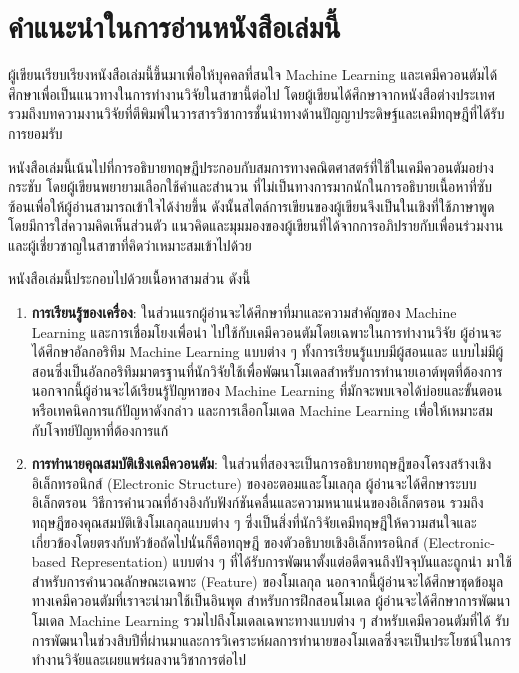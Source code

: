 

{

\chapter*{\centering คำแนะนำในการอ่านหนังสือเล่มนี้}

ผู้เขียนเรียบเรียงหนังสือเล่มนี้ขึ้นมาเพื่อให้บุคคลที่สนใจ Machine Learning และเคมีควอนตัมได้ศึกษาเพื่อเป็นแนวทางในการทำงานวิจัยในสาขานี้ต่อไป 
โดยผู้เขียนได้ศึกษาจากหนังสือต่างประเทศรวมถึงบทความงานวิจัยที่ตีพิมพ์ในวารสารวิชาการชั้นนำทางด้านปัญญาประดิษฐ์และเคมีทฤษฎีที่ได้รับการยอมรับ

หนังสือเล่มนี้เน้นไปที่การอธิบายทฤษฏีประกอบกับสมการทางคณิตศาสตร์ที่ใช้ในเคมีควอนตัมอย่างกระชับ โดยผู้เขียนพยายามเลือกใช้คำและสำนวน%
ที่ไม่เป็นทางการมากนักในการอธิบายเนื้อหาที่ซับซ้อนเพื่อให้ผู้อ่านสามารถเข้าใจได้ง่ายขึ้น ดังนั้นสไตล์การเขียนของผู้เขียนจึงเป็นในเชิงที่ใช้ภาษาพูด 
โดยมีการใส่ความคิดเห็นส่วนตัว แนวคิดและมุมมองของผู้เขียนที่ได้จากการอภิปรายกับเพื่อนร่วมงานและผู้เชี่ยวชาญในสาขาที่คิดว่าเหมาะสมเข้าไปด้วย

หนังสือเล่มนี้ประกอบไปด้วยเนื้อหาสามส่วน ดังนี้ 
%
\begin{enumerate}[topsep=0pt]
    \item \textbf{การเรียนรู้ของเครื่อง}: ในส่วนแรกผู้อ่านจะได้ศึกษาที่มาและความสำคัญของ Machine Learning และการเชื่อมโยงเพื่อนำ%
    ไปใช้กับเคมีควอนตัมโดยเฉพาะในการทำงานวิจัย ผู้อ่านจะได้ศึกษาอัลกอริทึม Machine Learning แบบต่าง ๆ ทั้งการเรียนรู้แบบมีผู้สอนและ%
    แบบไม่มีผู้สอนซึ่งเป็นอัลกอริทึมมาตรฐานที่นักวิจัยใช้เพื่อพัฒนาโมเดลสำหรับการทำนายเอาต์พุตที่ต้องการ นอกจากนี้ผู้อ่านจะได้เรียนรู้ปัญหาของ
    Machine Learning ที่มักจะพบเจอได้บ่อยและขั้นตอนหรือเทคนิคการแก้ปัญหาดังกล่าว และการเลือกโมเดล Machine Learning เพื่อให้เหมาะสม%
    กับโจทย์ปัญหาที่ต้องการแก้
    
    \item \textbf{การทำนายคุณสมบัติเชิงเคมีควอนตัม}: ในส่วนที่สองจะเป็นการอธิบายทฤษฎีของโครงสร้างเชิงอิเล็กทรอนิกส์ (Electronic 
    Structure) ของอะตอมและโมเลกุล ผู้อ่านจะได้ศึกษาระบบอิเล็กตรอน วิธีการคำนวณที่อ้างอิงกับฟังก์ชันคลื่นและความหนาแน่นของอิเล็กตรอน 
    รวมถึงทฤษฎีของคุณสมบัติเชิงโมเลกุลแบบต่าง ๆ ซึ่งเป็นสิ่งที่นักวิจัยเคมีทฤษฎีให้ความสนใจและเกี่ยวข้องโดยตรงกับหัวข้อถัดไปนั่นก็คือทฤษฎี%
    ของตัวอธิบายเชิงอิเล็กทรอนิกส์ (Electronic-based Representation) แบบต่าง ๆ ที่ได้รับการพัฒนาตั้งแต่อดีตจนถึงปัจจุบันและถูกนำ%
    มาใช้สำหรับการคำนวณลักษณะเฉพาะ (Feature) ของโมเลกุล นอกจากนี้ผู้อ่านจะได้ศึกษาชุดข้อมูลทางเคมีควอนตัมที่เราจะนำมาใช้เป็นอินพุต%
    สำหรับการฝึกสอนโมเดล ผู้อ่านจะได้ศึกษาการพัฒนาโมเดล Machine Learning รวมไปถึงโมเดลเฉพาะทางแบบต่าง ๆ สำหรับเคมีควอนตัมที่ได้%
    รับการพัฒนาในช่วงสิบปีที่ผ่านมาและการวิเคราะห์ผลการทำนายของโมเดลซึ่งจะเป็นประโยชน์ในการทำงานวิจัยและเผยแพร่ผลงานวิชาการต่อไป


\end{enumerate}}
